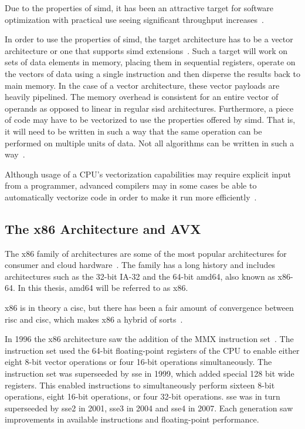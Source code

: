 Due to the properties of \gls{simd}, it has been an attractive target for software optimization with practical use seeing significant throughput increases~\cite{dickson2011}.

In order to use the properties of \gls{simd}, the target architecture has to be a vector architecture or one that supports \gls{simd} extensions~\cite{hennessy2011:vectorization}. Such a target will work on sets of data elements in memory, placing them in sequential registers, operate on the vectors of data using a single instruction and then disperse the results back to main memory. In the case of a vector architecture, these vector payloads are heavily pipelined. The memory overhead is consistent for an entire vector of operands as opposed to linear in regular \gls{sisd} architectures. Furthermore, a piece of code may have to be vectorized to use the properties offered by \gls{simd}. That is, it will need to be written in such a way that the same operation can be performed on multiple units of data. Not all algorithms can be written in such a way~\cite{dickson2011}.

Although usage of a CPU's vectorization capabilities may require explicit input from a programmer, advanced compilers may in some cases be able to automatically vectorize code in order to make it run more efficiently~\cite{dickson2011}.

\subsection{The x86 Architecture and AVX}

The \gls{x86} family of architectures are some of the most popular architectures for consumer and cloud hardware~\cite{carter2002}. The family has a long history and includes architectures such as the 32-bit IA-32 and the 64-bit amd64, also known as x86-64. In this thesis, amd64 will be referred to as \gls{x86}.

\gls{x86} is in theory a \gls{cisc}, but there has been a fair amount of convergence between \gls{risc} and \gls{cisc}, which makes \gls{x86} a hybrid of sorts~\cite{carter2002}.

In 1996 the \gls{x86} architecture saw the addition of the MMX instruction set~\cite{hennessy2011:avx}. The instruction set used the 64-bit floating-point registers of the CPU to enable either eight 8-bit vector operations or four 16-bit operations simultaneously. The instruction set was superseeded by \gls{sse} in 1999, which added special 128 bit wide registers. This enabled instructions to simultaneously perform sixteen 8-bit operations, eight 16-bit operations, or four 32-bit operations. \gls{sse} was in turn superseeded by \gls{sse}2 in 2001, \gls{sse}3 in 2004 and \gls{sse}4 in 2007. Each generation saw improvements in available instructions and floating-point performance.

